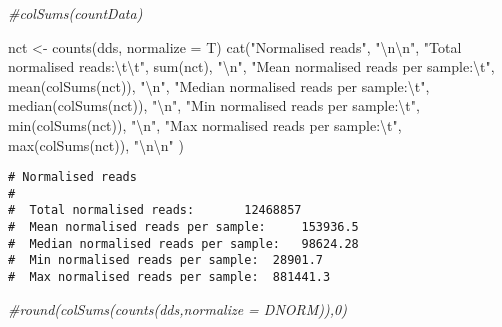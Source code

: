 \documentclass[
]{article}
\newenvironment{Shaded}{\begin{snugshade}}{\end{snugshade}}
\newcommand{\AttributeTok}[1]{\textcolor[rgb]{0.77,0.63,0.00}{#1}}
\newcommand{\CommentTok}[1]{\textcolor[rgb]{0.56,0.35,0.01}{\textit{#1}}}
\newcommand{\FunctionTok}[1]{\textcolor[rgb]{0.00,0.00,0.00}{#1}}
\newcommand{\NormalTok}[1]{#1}
\newcommand{\OtherTok}[1]{\textcolor[rgb]{0.56,0.35,0.01}{#1}}
\newcommand{\SpecialCharTok}[1]{\textcolor[rgb]{0.00,0.00,0.00}{#1}}
\newcommand{\StringTok}[1]{\textcolor[rgb]{0.31,0.60,0.02}{#1}}
\begin{document}
\begin{Shaded}
\begin{Highlighting}[]
\CommentTok{\#colSums(countData)}

\NormalTok{nct }\OtherTok{\textless{}{-}} \FunctionTok{counts}\NormalTok{(dds, }\AttributeTok{normalize =}\NormalTok{ T)}
\FunctionTok{cat}\NormalTok{(}\StringTok{"Normalised reads"}\NormalTok{, }\StringTok{"}\SpecialCharTok{\textbackslash{}n\textbackslash{}n}\StringTok{"}\NormalTok{,}
  \StringTok{"Total normalised reads:}\SpecialCharTok{\textbackslash{}t\textbackslash{}t}\StringTok{"}\NormalTok{, }\FunctionTok{sum}\NormalTok{(nct), }\StringTok{"}\SpecialCharTok{\textbackslash{}n}\StringTok{"}\NormalTok{,}
  \StringTok{"Mean normalised reads per sample:}\SpecialCharTok{\textbackslash{}t}\StringTok{"}\NormalTok{, }\FunctionTok{mean}\NormalTok{(}\FunctionTok{colSums}\NormalTok{(nct)), }\StringTok{"}\SpecialCharTok{\textbackslash{}n}\StringTok{"}\NormalTok{,}
  \StringTok{"Median normalised reads per sample:}\SpecialCharTok{\textbackslash{}t}\StringTok{"}\NormalTok{, }\FunctionTok{median}\NormalTok{(}\FunctionTok{colSums}\NormalTok{(nct)), }\StringTok{"}\SpecialCharTok{\textbackslash{}n}\StringTok{"}\NormalTok{,}
  \StringTok{"Min normalised reads per sample:}\SpecialCharTok{\textbackslash{}t}\StringTok{"}\NormalTok{, }\FunctionTok{min}\NormalTok{(}\FunctionTok{colSums}\NormalTok{(nct)), }\StringTok{"}\SpecialCharTok{\textbackslash{}n}\StringTok{"}\NormalTok{,}
  \StringTok{"Max normalised reads per sample:}\SpecialCharTok{\textbackslash{}t}\StringTok{"}\NormalTok{, }\FunctionTok{max}\NormalTok{(}\FunctionTok{colSums}\NormalTok{(nct)), }\StringTok{"}\SpecialCharTok{\textbackslash{}n\textbackslash{}n}\StringTok{"}
\NormalTok{)}
\end{Highlighting}
\end{Shaded}

\begin{verbatim}
# Normalised reads 
# 
#  Total normalised reads:       12468857 
#  Mean normalised reads per sample:     153936.5 
#  Median normalised reads per sample:   98624.28 
#  Min normalised reads per sample:  28901.7 
#  Max normalised reads per sample:  881441.3
\end{verbatim}

\begin{Shaded}
\begin{Highlighting}[]
\CommentTok{\#round(colSums(counts(dds,normalize = DNORM)),0)}
\end{Highlighting}
\end{Shaded}
\end{document}
